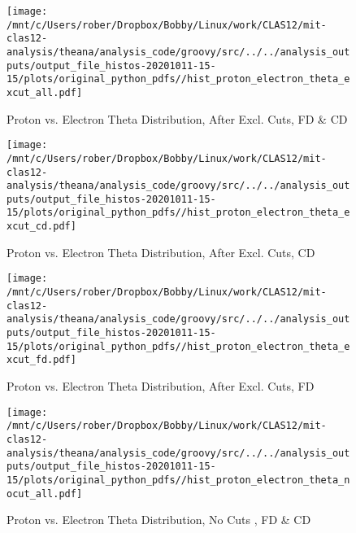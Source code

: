 \documentclass{article}
\begin{document}
\begin{landscape}
    \begin{figure}[h]
        \centering

        \texttt{[image: /mnt/c/Users/rober/Dropbox/Bobby/Linux/work/CLAS12/mit-clas12-analysis/theana/analysis\_code/groovy/src/../../analysis\_outputs/output\_file\_histos-20201011-15-15/plots/original\_python\_pdfs//hist\_proton\_electron\_theta\_excut\_all.pdf]}
        \captionsetup{textformat=empty,labelformat=blank}
        \caption{Proton vs. Electron Theta Distribution, After Excl. Cuts, FD \& CD}
    \end{figure}
    \clearpage
    
    \begin{figure}[h]
        \centering

        \texttt{[image: /mnt/c/Users/rober/Dropbox/Bobby/Linux/work/CLAS12/mit-clas12-analysis/theana/analysis\_code/groovy/src/../../analysis\_outputs/output\_file\_histos-20201011-15-15/plots/original\_python\_pdfs//hist\_proton\_electron\_theta\_excut\_cd.pdf]}
        \captionsetup{textformat=empty,labelformat=blank}
        \caption{Proton vs. Electron Theta Distribution, After Excl. Cuts, CD}
    \end{figure}
    \clearpage
    
    \begin{figure}[h]
        \centering

        \texttt{[image: /mnt/c/Users/rober/Dropbox/Bobby/Linux/work/CLAS12/mit-clas12-analysis/theana/analysis\_code/groovy/src/../../analysis\_outputs/output\_file\_histos-20201011-15-15/plots/original\_python\_pdfs//hist\_proton\_electron\_theta\_excut\_fd.pdf]}
        \captionsetup{textformat=empty,labelformat=blank}
        \caption{Proton vs. Electron Theta Distribution, After Excl. Cuts, FD}
    \end{figure}
    \clearpage
    
    \begin{figure}[h]
        \centering

        \texttt{[image: /mnt/c/Users/rober/Dropbox/Bobby/Linux/work/CLAS12/mit-clas12-analysis/theana/analysis\_code/groovy/src/../../analysis\_outputs/output\_file\_histos-20201011-15-15/plots/original\_python\_pdfs//hist\_proton\_electron\_theta\_nocut\_all.pdf]}
        \captionsetup{textformat=empty,labelformat=blank}
        \caption{Proton vs. Electron Theta Distribution, No Cuts , FD \& CD}
    \end{figure}
    \clearpage
    
    \begin{figure}[h]
        \centering


\end{figure}
\end{landscape}
\end{document}
